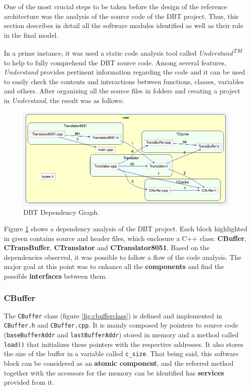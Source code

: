 One of the most crucial steps to be taken before the design of the reference architecture was the analysis of the source code of the DBT project. Thus, this section describes in detail all the software modules identified as well as their role in the final model. 

In a prime instance, it was used a static code analysis tool called \textit{Understand\textsuperscript{TM}} to help to fully comprehend the DBT source code. Among several features, \textit{Understand} provides pertinent information regarding the code and it can be used to easily check the contents and interactions between functions, classes, variables and others. After organizing all the source files in folders and creating a project in \textit{Understand}, the result was as follows:        
 
\begin{figure}[!hb]
\centerline{
\includegraphics[scale=0.55]{images/understand}}
\caption{DBT Dependency Graph.}
\label{fig:understand} 
\end{figure}

Figure \ref{fig:understand} shows a dependency analysis of the DBT project. Each block highlighted in green contains source and header files, which enclosure a C++ class: \textbf{CBuffer}, \textbf{CTransBuffer}, \textbf{CTranslator} and \textbf{CTranslator8051}. Based on the dependencies observed, it was possible to follow a flow of the code analysis. The major goal at this point was to enhance all the \textbf{components} and find the possible \textbf{interfaces} between them.

\newpage
\subsubsection*{CBuffer}

The \texttt{CBuffer} class (figure \ref{fig:cbufferclass}) is defined and implemented in \texttt{CBuffer.h} and \texttt{CBuffer.cpp}. It is mainly composed by pointers to source code (\texttt{baseBufferAddr} and \texttt{lastBufferAddr}) stored in memory and a method called \texttt{load()} that initializes these pointers with the respective addresses. It also stores the size of the buffer in a variable called \texttt{c\_size}. That being said, this software block can be considered as an \textbf{atomic component}, and the referred method together with the accessors for the memory can be identified has \textbf{services} provided from it.

